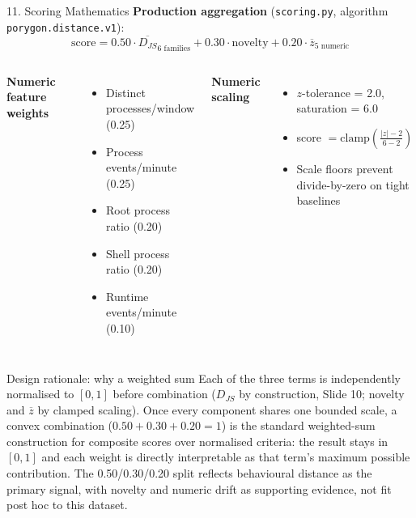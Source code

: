 \documentclass[aspectratio=169, 11pt]{beamer}
\begin{document}
\begin{frame}{11. Scoring Mathematics}
    \footnotesize
    \textbf{Production aggregation} (\texttt{scoring.py}, algorithm \texttt{porygon.distance.v1}):
    \[
        \text{score} = 0.50\cdot\overline{D_{JS}}_{\text{6 families}} + 0.30\cdot\text{novelty} + 0.20\cdot\overline{z}_{\text{5 numeric}}
    \]
    \begin{columns}[T]
        \textbf{Numeric feature weights}
        \begin{itemize}\setlength\itemsep{1pt}
            \item Distinct processes/window (0.25)
            \item Process events/minute (0.25)
            \item Root process ratio (0.20)
            \item Shell process ratio (0.20)
            \item Runtime events/minute (0.10)
        \end{itemize}
        \textbf{Numeric scaling}
        \begin{itemize}\setlength\itemsep{1pt}
            \item $z$-tolerance = 2.0, saturation = 6.0
            \item score $= \text{clamp}\!\left(\frac{|z|-2}{6-2}\right)$
            \item Scale floors prevent divide-by-zero on tight baselines
        \end{itemize}
    \end{columns}
    \vspace{0.15cm}
    \begin{block}{\scriptsize Design rationale: why a weighted sum}
        \scriptsize Each of the three terms is independently normalised to $[0,1]$ before combination ($D_{JS}$ by construction, Slide 10; novelty and $\overline{z}$ by clamped scaling). Once every component shares one bounded scale, a convex combination ($0.50+0.30+0.20=1$) is the standard weighted-sum construction for composite scores over normalised criteria: the result stays in $[0,1]$ and each weight is directly interpretable as that term's maximum possible contribution. The 0.50/0.30/0.20 split reflects behavioural distance as the primary signal, with novelty and numeric drift as supporting evidence, not fit post hoc to this dataset.
    \end{block}
\end{frame}
\end{document}
